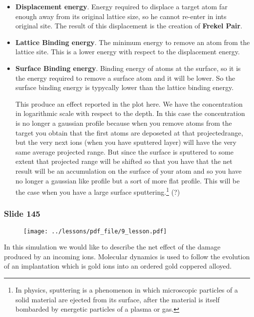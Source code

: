 \documentclass[../main/main.tex]{subfiles}
\begin{document}
\begin{itemize}
\item \textbf{Displacement energy}. Energy required to displace a target atom far enough away from its original lattice size, so he cannot re-enter in ints original site.
The result of this displacement is the creation of \textbf{Frekel Pair}.

\item \textbf{Lattice Binding energy}. The minimum energy to remove an atom from the lattice site.
This is a lower energy with respect to the displacement energy.

\item \textbf{Surface Binding energy}. Binding energy of atoms at the surface, so it is the energy required to remove a surface atom and it will be lower. So the surface binding energy is typycally lower than the lattice binding energy.

This produce an effect reported in the plot here. We have the concentration in logarithmic scale with respect to the depth. In this case the concentration is no longer a gaussian profile because when you remove atoms from the target you obtain that the first atoms are deposeted at that projectedrange, but the very next ions (when you have sputtered layer) will have the very same average projected range. But since the surface is sputtered to some extent that projected range will be shifted so that you have that the net result will be an accumulation on the surface of your atom and so you have no longer a gaussian like profile but a sort of more flat profile. This will be the case when you have a large surface sputtering.\footnote{In physics, sputtering is a phenomenon in which microscopic particles of a solid material are ejected from its surface, after the material is itself bombarded by energetic particles of a plasma or gas.} (?)

\end{itemize}

\newpage 

\subsubsection{Slide 145}

\begin{figure}[h!]
\centering
\texttt{[image: ../lessons/pdf\_file/9\_lesson.pdf]}
\end{figure}

In this simulation we would like to describe the net effect of the damage produced by an incoming ions.
Molecular dynamics is used to follow the evolution of an implantation which is gold ions into an ordered gold coppered alloyed.
\end{document}

